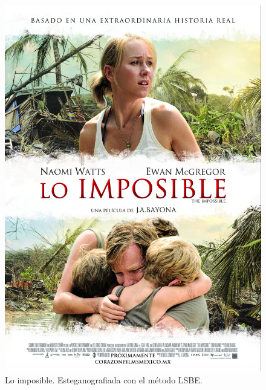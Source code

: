 \documentclass[a4paper,10pt]{article}
\begin{document}
\begin{figure}[!htb]
\endminipage
{}%
   \includegraphics[scale=0.5]{./images/loimposible.png}
  \caption{Lo imposible. Esteganografiada con el método LSBE.}\label{fig:awesome_image8}
\endminipage
\end{figure}

\clearpage
\end{document}
